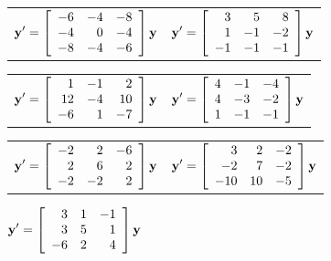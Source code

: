 \begin{exerciselist}
  \begin{tabular}[t]{@{}p{168pt}@{}p{168pt}}
    \item\label{exer:10.4.9} $\displaystyle{{\bf y}'= \left[\begin{array}{rrr}-6&-4&-8\\-4&0&-4\\-8&-4&-6\end{array}\right]{\bf y}}$ &
    \item\label{exer:10.4.10} $\displaystyle{{\bf y}'= \left[\begin{array}{rrr}3&5&8\\1&-1& -2\\-1&-1&-1\end{array}\right]{\bf y}}$
  \end{tabular}

  \begin{tabular}[t]{@{}p{168pt}@{}p{168pt}}
    \item\label{exer:10.4.11} $\displaystyle{{\bf y}'= \left[\begin{array}{rrr}1&-1&2\\12&-4 &10\\-6&1&-7\end{array}\right]{\bf y}}$ &
    \item\label{exer:10.4.12} $\displaystyle{{\bf y}'= \left[\begin{array}{rrr}4&-1&-4\\4&-3&-2\\1&-1&-1\end{array}\right]{\bf y}}$
  \end{tabular}

  \begin{tabular}[t]{@{}p{168pt}@{}p{168pt}}
    \item\label{exer:10.4.13} $\displaystyle{{\bf y}'= \left[\begin{array}{rrr}-2&2&-6\\2&6&2\\-2&-2& 2\end{array}\right]{\bf y}}$ &
    \item\label{exer:10.4.14} $\displaystyle{{\bf y}'= \left[\begin{array}{rrr}3&2&-2\\-2&7&-2\\ -10&10&-5\end{array}\right]{\bf y}}$
  \end{tabular}

  \item\label{exer:10.4.15} $\displaystyle{{\bf y}'= \left[\begin{array}{rrr}3&1&-1\\3&5&1\\-6&2&4\end{array} \right]{\bf y}}$


\end{exerciselist}
